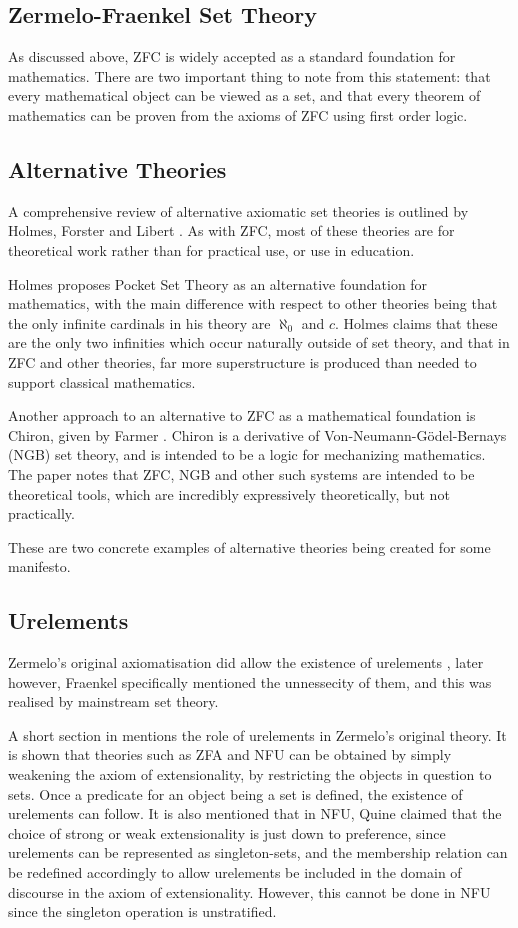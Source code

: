 \documentclass[12pt]{article}
\theoremstyle{definition}
\begin{document}
\subsection{Zermelo-Fraenkel Set Theory}
As discussed above, ZFC is widely accepted as a standard foundation for mathematics. There are two important thing to note from this statement: that every mathematical object can be viewed as a set, and that every theorem of mathematics can be proven from the axioms of ZFC using first order logic.

\subsection{Alternative Theories}
A comprehensive review of alternative axiomatic set theories is outlined by Holmes, Forster and Libert \cite{ast}.
As with ZFC, most of these theories are for theoretical work rather than for practical use, or use in education.

Holmes proposes Pocket Set Theory \cite{pocket} as an alternative foundation for mathematics, with the main difference with respect to other theories being that the only infinite cardinals in his theory are $\aleph_0$ and $c$.
Holmes claims that these are the only two infinities which occur naturally outside of set theory, and that in ZFC and other theories, far more superstructure is produced than needed to support classical mathematics.

Another approach to an alternative to ZFC as a mathematical foundation is Chiron, given by Farmer \cite{chiron}. Chiron is a derivative of Von-Neumann-G\"odel-Bernays (NGB) set theory, and is intended to be a logic for mechanizing mathematics. The paper notes that ZFC, NGB and other such systems are intended to be theoretical tools, which are incredibly expressively theoretically, but not practically.

These are two concrete examples of alternative theories being created for some manifesto.
\subsection{Urelements}
Zermelo's original axiomatisation did allow the existence of urelements \cite{zermelo}, later however, Fraenkel specifically mentioned the unnessecity of them, and this was realised by mainstream set theory.

A short section in \cite{ast} mentions the role of urelements in Zermelo's original theory. It is shown that theories such as ZFA and NFU can be obtained by simply weakening the axiom of extensionality, by restricting the objects in question to sets. Once a predicate for an object being a set is defined, the existence of urelements can follow. It is also mentioned that in NFU, Quine claimed that the choice of strong or weak extensionality is just down to preference, since urelements can be represented as singleton-sets, and the membership relation can be redefined accordingly to allow urelements be included in the domain of discourse in the axiom of extensionality. However, this cannot be done in NFU since the singleton operation is unstratified.
\end{document}
